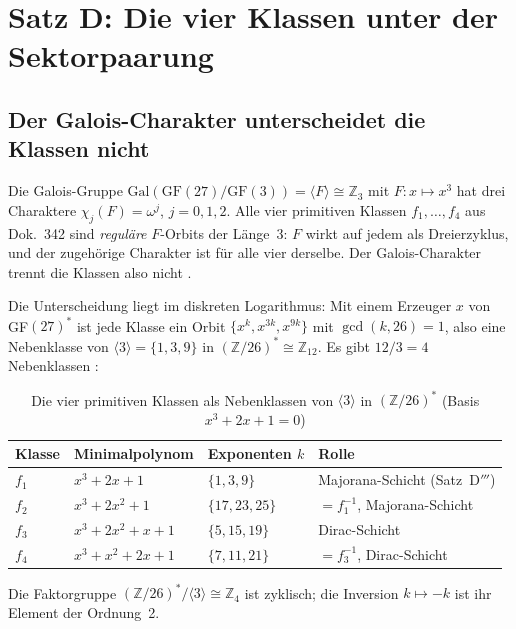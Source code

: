 \section{Satz D: Die vier Klassen unter der Sektorpaarung}

\subsection{Der Galois-Charakter unterscheidet die Klassen nicht}

Die Galois-Gruppe $\mathrm{Gal}(\mathrm{GF}(27)/\mathrm{GF}(3)) = \langle F \rangle \cong \mathbb{Z}_3$
mit $F\colon x \mapsto x^3$ hat drei Charaktere $\chi_j(F) = \omega^j$, $j = 0,1,2$.
Alle vier primitiven Klassen $f_1, \ldots, f_4$ aus Dok.~342 sind \emph{reguläre}
$F$-Orbits der Länge~3: $F$ wirkt auf jedem als Dreierzyklus, und der zugehörige
Charakter ist für alle vier derselbe. Der Galois-Charakter trennt die Klassen
also nicht \BM.

Die Unterscheidung liegt im diskreten Logarithmus: Mit einem Erzeuger $x$ von
GF$(27)^*$ ist jede Klasse ein Orbit $\{x^k, x^{3k}, x^{9k}\}$ mit $\gcd(k,26)=1$,
also eine Nebenklasse von $\langle 3\rangle = \{1,3,9\}$ in
$(\mathbb{Z}/26)^* \cong \mathbb{Z}_{12}$. Es gibt $12/3 = 4$ Nebenklassen \BM:

\begin{table}[H]
\centering
\caption{Die vier primitiven Klassen als Nebenklassen von $\langle 3\rangle$ in $(\mathbb{Z}/26)^*$
  (Basis $x^3 + 2x + 1 = 0$)}
\begin{tabular}{llll}
\toprule
Klasse & Minimalpolynom & Exponenten $k$ & Rolle \\
\midrule
$f_1$ & $x^3 + 2x + 1$ & $\{1, 3, 9\}$ & Majorana-Schicht (Satz~D$'''$) \\
$f_2$ & $x^3 + 2x^2 + 1$ & $\{17, 23, 25\}$ & $= f_1^{-1}$, Majorana-Schicht \\
$f_3$ & $x^3 + 2x^2 + x + 1$ & $\{5, 15, 19\}$ & Dirac-Schicht \\
$f_4$ & $x^3 + x^2 + 2x + 1$ & $\{7, 11, 21\}$ & $= f_3^{-1}$, Dirac-Schicht \\
\bottomrule
\end{tabular}
\end{table}

Die Faktorgruppe $(\mathbb{Z}/26)^*/\langle 3\rangle \cong \mathbb{Z}_4$ ist zyklisch;
die Inversion $k \mapsto -k$ ist ihr Element der Ordnung~2.

